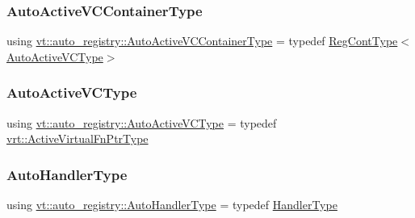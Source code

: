 \subsubsection{\texorpdfstring{Auto\+Active\+V\+C\+Container\+Type}{AutoActiveVCContainerType}}
{\footnotesize\ttfamily using \hyperlink{namespacevt_1_1auto__registry_a39e866b6d2db660ab9cd9f7cacfa5595}{vt\+::auto\+\_\+registry\+::\+Auto\+Active\+V\+C\+Container\+Type} = typedef \hyperlink{namespacevt_1_1auto__registry_a988a4943e4c8fe82b56f5b13bddceb2b}{Reg\+Cont\+Type}$<$\hyperlink{namespacevt_1_1auto__registry_a4a96fdbb11b7be748365fcfc6fc46862}{Auto\+Active\+V\+C\+Type}$>$}

\mbox{\label{namespacevt_1_1auto__registry_a4a96fdbb11b7be748365fcfc6fc46862}} 
\subsubsection{\texorpdfstring{Auto\+Active\+V\+C\+Type}{AutoActiveVCType}}
{\footnotesize\ttfamily using \hyperlink{namespacevt_1_1auto__registry_a4a96fdbb11b7be748365fcfc6fc46862}{vt\+::auto\+\_\+registry\+::\+Auto\+Active\+V\+C\+Type} = typedef \hyperlink{namespacevt_1_1vrt_a53c67fe3c204169d703b59fc9fd3f06c}{vrt\+::\+Active\+Virtual\+Fn\+Ptr\+Type}}

\mbox{\label{namespacevt_1_1auto__registry_ae295e18699146815bb7d7674594d95d7}} 
\subsubsection{\texorpdfstring{Auto\+Handler\+Type}{AutoHandlerType}}
{\footnotesize\ttfamily using \hyperlink{namespacevt_1_1auto__registry_ae295e18699146815bb7d7674594d95d7}{vt\+::auto\+\_\+registry\+::\+Auto\+Handler\+Type} = typedef \hyperlink{namespacevt_af64846b57dfcaf104da3ef6967917573}{Handler\+Type}}

\mbox{\label{namespacevt_1_1auto__registry_af3f78826dd69454aeb914a3c7bec0a52}} 

